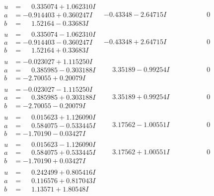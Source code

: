 \documentclass[1p]{elsarticle_modified}
\theoremstyle{definition}
\begin{document}
$$\begin{array}{c|c|c}
\begin{aligned}
u &= \phantom{-}0.335074 + 1.062310 I \\
a &= -0.914403 + 0.360247 I \\
b &= \phantom{-}1.52164 - 0.33683 I\end{aligned}
 & -0.43348 - 2.64715 I & \phantom{-0.000000 } 0 \\ \hline\begin{aligned}
u &= \phantom{-}0.335074 - 1.062310 I \\
a &= -0.914403 - 0.360247 I \\
b &= \phantom{-}1.52164 + 0.33683 I\end{aligned}
 & -0.43348 + 2.64715 I & \phantom{-0.000000 } 0 \\ \hline\begin{aligned}
u &= -0.023027 + 1.115250 I \\
a &= \phantom{-}0.385985 - 0.303188 I \\
b &= -2.70055 + 0.20079 I\end{aligned}
 & \phantom{-}3.35189 - 0.99254 I & \phantom{-0.000000 } 0 \\ \hline\begin{aligned}
u &= -0.023027 - 1.115250 I \\
a &= \phantom{-}0.385985 + 0.303188 I \\
b &= -2.70055 - 0.20079 I\end{aligned}
 & \phantom{-}3.35189 + 0.99254 I & \phantom{-0.000000 } 0 \\ \hline\begin{aligned}
u &= \phantom{-}0.015623 + 1.126090 I \\
a &= \phantom{-}0.584075 - 0.533445 I \\
b &= -1.70190 - 0.03427 I\end{aligned}
 & \phantom{-}3.17562 - 1.00551 I & \phantom{-0.000000 } 0 \\ \hline\begin{aligned}
u &= \phantom{-}0.015623 - 1.126090 I \\
a &= \phantom{-}0.584075 + 0.533445 I \\
b &= -1.70190 + 0.03427 I\end{aligned}
 & \phantom{-}3.17562 + 1.00551 I & \phantom{-0.000000 } 0 \\ \hline\begin{aligned}
u &= \phantom{-}0.242499 + 0.805416 I \\
a &= \phantom{-}0.116576 + 0.817043 I \\
b &= \phantom{-}1.13571 + 1.80548 I\end{aligned}

\end{array}$$
\end{document}
